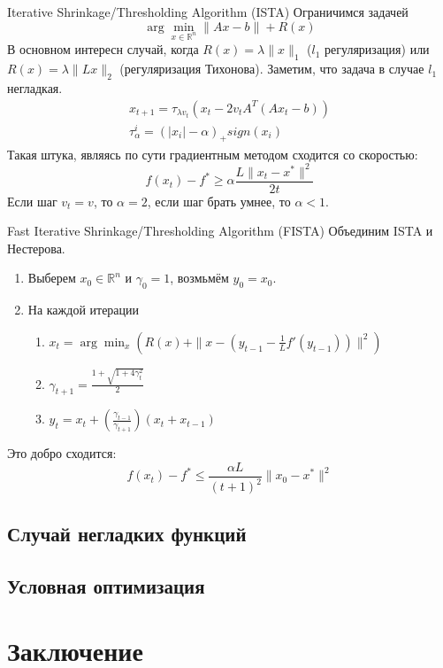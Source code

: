 \documentclass[14pt, fleqn, xcolor={dvipsnames, table}]{beamer}
\begin{document}
\begin{frame}{Iterative Shrinkage/Thresholding Algorithm (ISTA)}
\small
Ограничимся задачей
$$
\arg\min_{x \in \mathbb{R}^n}\|Ax - b\| + R(x)
$$
В основном интересн случай, когда $R(x) = \lambda \|x\|_1$ ($l_1$ регуляризация) или $R(x)=\lambda\|Lx\|_2$ (регуляризация Тихонова).
Заметим, что задача в случае $l_1$ негладкая.
$$\begin{array}{l}
x_{t+1} = \tau_{\lambda v_t}(x_t - 2v_tA^T(Ax_t - b)) \\
\tau_{\alpha}^i = (|x_i| - \alpha)_{+}sign(x_i)
\end{array}$$
Такая штука, являясь по сути градиентным методом сходится со скоростью:
$$
f(x_t) - f^* \ge \alpha \frac{L\|x_t - x^*\|^2}{2t}
$$
Если шаг $v_t = v$, то $\alpha=2$, если шаг брать умнее, то $\alpha<1$.
\end{frame}

\begin{frame}{Fast Iterative Shrinkage/Thresholding Algorithm (FISTA)}
Объединим ISTA и Нестерова.
\begin{enumerate}
  \item Выберем $x_0 \in \mathbb{R}^n$ и $\gamma_0 = 1$, возмьмём $y_0=x_0$.
  \item На каждой итерации
  \begin{enumerate}
    \item $x_t = \arg\min_x(R(x) + \|x - (y_{t-1} - \frac{1}{L}f'(y_{t-1}))\|^2)$
    \item $\gamma_{t+1} = \frac{1 + \sqrt{1+4\gamma_t^2}}{2}$
    \item $y_t = x_t + (\frac{\gamma_{t-1}}{\gamma_{t+1}})(x_t + x_{t-1})$
  \end{enumerate}
\end{enumerate}
Это добро сходится:
$$
f(x_t) - f^* \le \frac{\alpha L}{(t+1)^2}\|x_0 - x^*\|^2
$$
\end{frame}

\subsection{Случай негладких функций}
\subsection{Условная оптимизация}
\section{Заключение}
\end{document}
